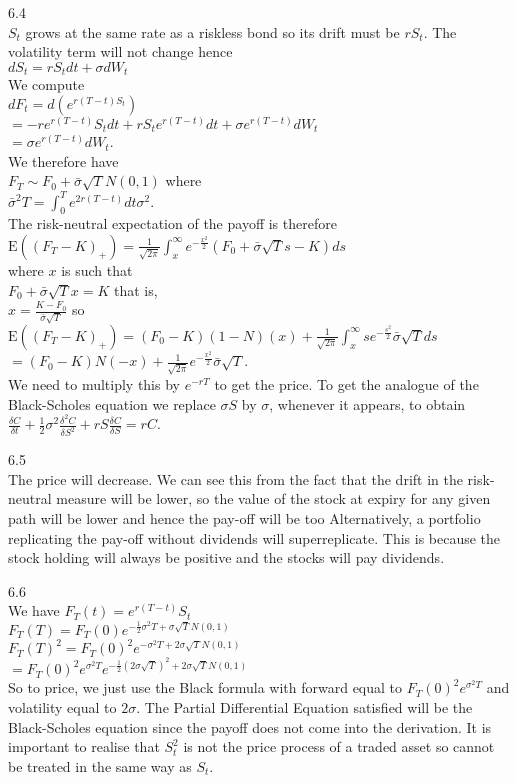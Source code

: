 6.4 \\
$S_t$ grows at the same rate as a riskless bond so its drift must be $r S_t$. The volatility term will not change hence \\
$dS_t = r S_t dt + \sigma dW_t$ \\
We compute \\
$dF_t=d(e^{r(T-t)S_t})$ \\
$=-re^{r(T-t)}S_t dt + r S_t e^{r(T-t)} dt + \sigma e^{r(T-t)} dW_t$ \\
$=\sigma e^{r(T-t)} dW_t$. \\
We therefore have \\
$F_T \sim F_0 + \bar{\sigma} \sqrt{T} N(0,1)$ where \\
$\bar{\sigma}^2 T = \int_0^T e^{2r(T-t)} dt \sigma^2$. \\
The risk-neutral expectation of the payoff is therefore \\
$\text{E}((F_T - K)_{+}) = \frac{1}{\sqrt{2 \pi}} \int_x^{\infty} e^{-\frac{x^2}{2}} (F_0 + \bar{\sigma} \sqrt{T} s - K) ds$ \\
where $x$ is such that \\
$F_0 + \bar{\sigma} \sqrt{T} x = K$ that is, \\
$x=\frac{K-F_0}{\bar{\sigma} \sqrt{T}}$ so \\
$\text{E}((F_T - K)_{+}) = (F_0 - K)(1 - N)(x) + \frac{1}{\sqrt{2 \pi}} \int_x^{\infty} s e^{-\frac{s^2}{2}} \bar{\sigma} \sqrt{T} ds$ \\
$=(F_0 - K)N(-x) + \frac{1}{\sqrt{2 \pi}} e^{-\frac{x^2}{2}} \bar{\sigma} \sqrt{T}$. \\
We need to multiply this by $e^{-rT}$ to get the price. To get the analogue of the Black-Scholes equation we replace $\sigma S$ by $\sigma$, whenever it appears, to obtain $\frac{\delta C}{\delta t} + \frac{1}{2} \sigma^2 \frac{\delta^2 C}{\delta S^2} + r S \frac{\delta C}{\delta S} = r C$.

6.5 \\
The price will decrease. We can see this from the fact that the drift in the risk-neutral measure will be lower, so the value of the stock at expiry for any given path will be lower and hence the pay-off will be too Alternatively, a portfolio replicating the pay-off without dividends will superreplicate. This is because the stock holding will always be positive and the stocks will pay dividends.

6.6 \\
We have $F_T (t)=e^{r(T-t)} S_t$ \\
$F_T (T)=F_T (0) e^{-\frac{1}{2} \sigma^2 T + \sigma \sqrt{T} N(0,1)}$ \\
$F_T (T)^2=F_T (0)^2 e^{-\sigma^2 T + 2 \sigma \sqrt{T} N(0,1)}$ \\
$=F_T (0)^2 e^{\sigma^2 T} e^{-\frac{1}{2}(2 \sigma \sqrt{T})^2 + 2 \sigma \sqrt{T} N(0,1)}$ \\
So to price, we just use the Black formula with forward equal to $F_T (0)^2 e^{\sigma^2 T}$ and volatility equal to $2 \sigma$. The Partial Differential Equation satisfied will be the Black-Scholes equation since the payoff does not come into the derivation. It is important to realise that $S_t^2$ is not the price process of a traded asset so cannot be treated in the same way as $S_t$.

